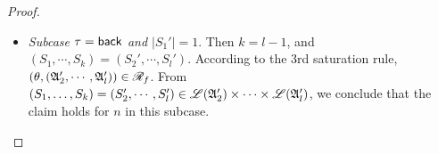 \begin{proof}
{\begin{itemize}
\begin{itemize}
$$\begin{array}{l}
            \end{array}
            $$  
            we conclude that the claim holds for $n$ in this subcase. 
            \item if $S_i' \in \Lang(\Aut_i') = \Lang(\Aut_{A_0\stackrel{C}\rightsquigarrow D})$ for some $C\in\Gamma_{A_0}\setminus\{A_0'\}$, $D\in\Gamma_{A_0}$, moreover $B' = A_0'$, $S_i' = S\cdot [A_0]\cdot S'$ for some $S,S'\in\Gamma_{A_0}^*$ with $A_0'\notin S$, $S_1' \in \Lang(\Aut_{A\rightsquigarrow B})$ for some $A\in\act_\STK\cup\act_\SIT$, $S_1 = [A_0]\cdot S'$, $(S_2, \dots, S_k) = (S'_1, \dots, S'_{i-1}, S'_{i+1}, \dots, S'_l)$. According to the 2nd saturation rule, we know that 
            $$(\theta, (\Aut_{A_0\stackrel{C}\rightsquigarrow A_0'}, \Aut_1',\cdots, \Aut_{i-1}', \Aut_{i+1}', \cdots, \Aut_{l}')) \in \AutReach_f.$$
            From 
            $\Lang(\Aut_{A_0\stackrel{C}\rightsquigarrow A_0'}) = \{[A_0']\cdot S\mid S'\cdot[A_0']\cdot S\in\Lang(\Aut_{A_0\stackrel{C}\rightsquigarrow D})\}$,
            we know that $[A_0']\cdot S'\in\Lang(\Aut_{A_0\stackrel{C}\rightsquigarrow A_0'})$. From
            $$
            \begin{array}{l}
                (S_1,\cdots,S_k) = ([A_0']\cdot S', S_1', \cdots, S_{i-1}', S_{i+1}', \cdots, S_l') \in \\
                \ \ \Lang(\Aut_{A_0\stackrel{C}\rightsquigarrow A_0'}) \times \Lang(\Aut_1') \times \cdots \times \Lang(\Aut_{i-1}') \times \Lang(\Aut_{i+1}')\times \cdots \times \Lang(\Aut_{l}'),
            \end{array}
            $$  
            we conclude that the claim holds for $n$ in this subcase. 
        \end{itemize}
        \item \emph{Subcase $\tau = {\mathsf{back} }$ and $|S_1'|=1$}. Then $k = l - 1$, and $(S_1,\cdots,S_k) = (S_2',\cdots,S_l')$.  According to the 3rd saturation rule, $(\theta, ({\mathfrak{A} }_2',\cdots,{\mathfrak{A} }_l')) \in \mathscr{R}_f$. From $(S_1,\dots,S_k) = (S'_2, \cdots, S'_l) \in {\mathscr{L} }({\mathfrak{A} }_2') \times \cdots \times {\mathscr{L} }({\mathfrak{A} }_l')$, we conclude that the claim holds for $n$ in this subcase. 
    \end{itemize}
}
%
    \end{proof}


